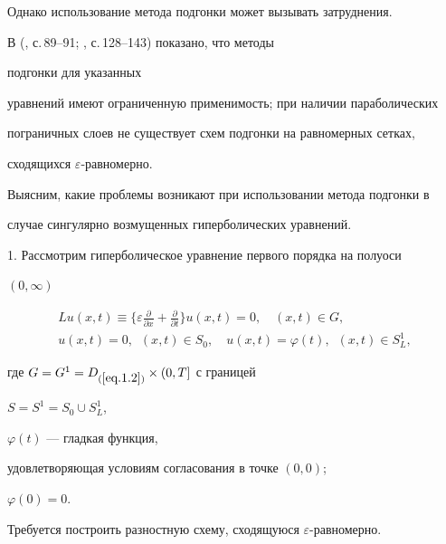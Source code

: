 Однако использование метода подгонки может вызывать затруднения.


В (\cite{6}, с.\,89--91; \cite{8}, с.\,128--143) показано, что методы


подгонки для указанных


уравнений имеют ограниченную применимость; при наличии параболических


пограничных слоев не существует схем подгонки на равномерных сетках,


сходящихся $\varepsilon$-равномерно.





Выясним, какие проблемы возникают при использовании метода подгонки в


случае сингулярно возмущенных гиперболических уравнений.





1. Рассмотрим гиперболическое уравнение первого порядка на полуоси


$(0,\infty)$


\begin{equation} \label{eq.3.1}


\begin{array}{c}


\displaystyle L u(x, t)\equiv \bigg\{\varepsilon \frac{\partial}{\partial x}


+\frac{\partial}{\partial


t}\bigg\} u(x, t)=0, \quad (x, t)\in G, \\[3mm]


u(x, t)=0, \ \; (x, t)\in S_0,\quad


u(x, t)=\varphi(t), \ \; (x, t)\in S^1_L,


\end{array}


\end{equation}


где $G=G^1=D_{(\ref{eq.1.2})}\times (0,T]$ с границей


$S=S^1=S_0\cup S^1_L$,


$\varphi(t)$ --- гладкая функция,


удовлетворяющая условиям согласования в точке $(0, 0)$;


$\varphi(0)=0$.


Требуется построить разностную схему, сходящуюся $\varepsilon$-равномерно.





